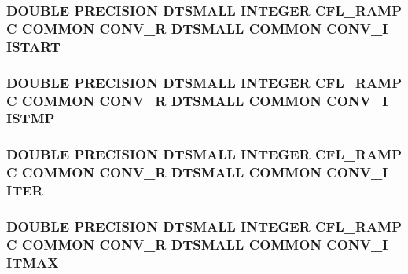 \hypertarget{conv_8com_a860a2b695f2e90fdf11124cedcd72ef6}{
\subsubsection[{I\-S\-T\-A\-R\-T}]{\setlength{\rightskip}{0pt plus 5cm}D\-O\-U\-B\-L\-E P\-R\-E\-C\-I\-S\-I\-O\-N D\-T\-S\-M\-A\-L\-L I\-N\-T\-E\-G\-E\-R C\-F\-L\-\_\-\-R\-A\-M\-P C C\-O\-M\-M\-O\-N C\-O\-N\-V\-\_\-\-R D\-T\-S\-M\-A\-L\-L C\-O\-M\-M\-O\-N C\-O\-N\-V\-\_\-\-I I\-S\-T\-A\-R\-T}}\label{conv_8com_a860a2b695f2e90fdf11124cedcd72ef6}
\hypertarget{conv_8com_a6a9285d211dcd0595d66dcbd00736595}{
\subsubsection[{I\-S\-T\-M\-P}]{\setlength{\rightskip}{0pt plus 5cm}D\-O\-U\-B\-L\-E P\-R\-E\-C\-I\-S\-I\-O\-N D\-T\-S\-M\-A\-L\-L I\-N\-T\-E\-G\-E\-R C\-F\-L\-\_\-\-R\-A\-M\-P C C\-O\-M\-M\-O\-N C\-O\-N\-V\-\_\-\-R D\-T\-S\-M\-A\-L\-L C\-O\-M\-M\-O\-N C\-O\-N\-V\-\_\-\-I I\-S\-T\-M\-P}}\label{conv_8com_a6a9285d211dcd0595d66dcbd00736595}
\hypertarget{conv_8com_a5e8268d7a99a27a3889882b8cb685176}{
\subsubsection[{I\-T\-E\-R}]{\setlength{\rightskip}{0pt plus 5cm}D\-O\-U\-B\-L\-E P\-R\-E\-C\-I\-S\-I\-O\-N D\-T\-S\-M\-A\-L\-L I\-N\-T\-E\-G\-E\-R C\-F\-L\-\_\-\-R\-A\-M\-P C C\-O\-M\-M\-O\-N C\-O\-N\-V\-\_\-\-R D\-T\-S\-M\-A\-L\-L C\-O\-M\-M\-O\-N C\-O\-N\-V\-\_\-\-I I\-T\-E\-R}}\label{conv_8com_a5e8268d7a99a27a3889882b8cb685176}
\hypertarget{conv_8com_aed14565252ecc7b0d32f2e1eece0e781}{
\subsubsection[{I\-T\-M\-A\-X}]{\setlength{\rightskip}{0pt plus 5cm}D\-O\-U\-B\-L\-E P\-R\-E\-C\-I\-S\-I\-O\-N D\-T\-S\-M\-A\-L\-L I\-N\-T\-E\-G\-E\-R C\-F\-L\-\_\-\-R\-A\-M\-P C C\-O\-M\-M\-O\-N C\-O\-N\-V\-\_\-\-R D\-T\-S\-M\-A\-L\-L C\-O\-M\-M\-O\-N C\-O\-N\-V\-\_\-\-I I\-T\-M\-A\-X}}\label{conv_8com_aed14565252ecc7b0d32f2e1eece0e781}
